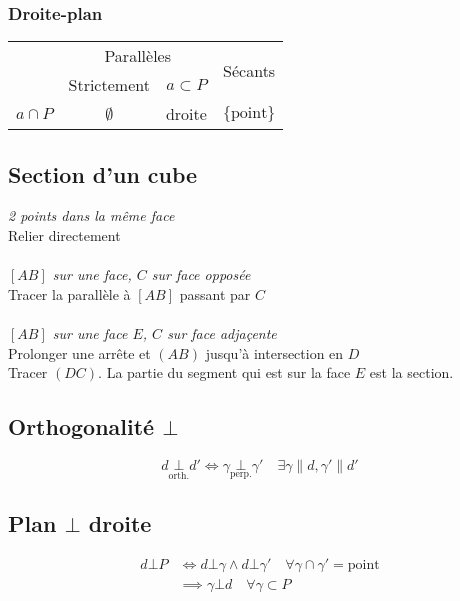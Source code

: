 \documentclass{article}
\begin{document}
\subsubsection{Droite-plan}

\begin{table}[H]
    \centering
    \begin{tabular}{r|c|c|c}
           & \multicolumn{2}{c|}{Parallèles}                & \multirow{2}{*}{Sécants} \\ \cline{2-3}
           & Strictement & $a \subset P$ &                          \\ \hline\hline
$a \cap P$ & $\emptyset$            & droite                & $\{ \text{point} \}$                   
\end{tabular}
\end{table}

\subsection{Section d'un cube}

\textit{2 points dans la même face}\\
Relier directement\\\\
\textit{$[AB]$ sur une face, $C$ sur face opposée} \\
Tracer la parallèle à $[AB]$ passant par $C$\\\\
\textit{$[AB]$ sur une face $E$, $C$ sur face adjaçente}\\
Prolonger une arrête et $(AB)$ jusqu'à intersection en $D$\\
Tracer $(DC)$. La partie du segment qui est sur la face $E$ est la section.

\subsection{Orthogonalité $\bot$}

\[d \underset{\text{orth.}}{\bot} d' \iff \gamma \underset{\text{perp.}}{\bot} \gamma' \quad\exists \gamma \parallel d, \gamma' \parallel d'\]

\subsection{Plan $\bot$ droite}

\begin{equation*}
    \begin{split}
        d \bot P &\iff d \bot \gamma \land d \bot \gamma' \quad \forall \gamma \cap \gamma' = \text{point} \\
                 &\implies \gamma \bot d \quad\forall \gamma \subset P
    \end{split}
\end{equation*}
\end{document}
